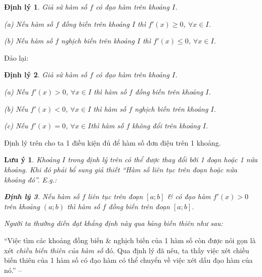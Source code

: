 \documentclass[oneside]{book}
\numberwithin{equation}{section}
\newtheorem{luuy}{Lưu ý}[section]
\newtheorem{dinhly}{Định lý}[section]
\begin{document}
\begin{dinhly}
	Giả sử hàm số $f$ có đạo hàm trên khoảng $I$.
	\begin{enumerate*}
		\item[(a)] Nếu hàm số $f$ đồng biến trên khoảng $I$ thì $f'(x)\ge 0$, $\forall x\in I$.
		\item[(b)] Nếu hàm số $f$ nghịch biến trên khoảng $I$ thì $f'(x)\le 0$, $\forall x\in I$.
	\end{enumerate*}
\end{dinhly}
Đảo lại:

\begin{dinhly}
	\label{thm:dau dao ham & tinh dong bien}
	Giả sử hàm số $f$ có đạo hàm trên khoảng $I$.
	\begin{enumerate*}
		\item[(a)] Nếu $f'(x) > 0$, $\forall x\in I$ thì hàm số $f$ đồng biến trên khoảng $I$.
		\item[(b)] Nếu $f'(x) < 0$, $\forall x\in I$ thì hàm số $f$ nghịch biến trên khoảng $I$.
		\item[(c)] Nếu $f'(x) = 0$, $\forall x\in I$thì hàm số $f$ không đổi trên khoảng $I$.
	\end{enumerate*}
\end{dinhly}
Định lý trên cho ta 1 điều kiện đủ để hàm số đơn điệu trên 1 khoảng.

\begin{luuy}
	Khoảng $I$ trong định lý trên có thể được thay đổi bởi 1 đoạn hoặc 1 nửa khoảng. Khi đó phải bổ sung giả thiết ``Hàm số liên tục trên đoạn hoặc nửa khoảng đó''. E.g.:
	
	\begin{dinhly}
		Nếu hàm số $f$ liên tục trên đoạn $[a;b]$ \& có đạo hàm $f'(x) > 0$ trên khoảng $(a;b)$ thì hàm số $f$ đồng biến trên đoạn $[a;b]$.
	\end{dinhly}
	Người ta thường diễn đạt khẳng định này qua bảng biến thiên như sau:
	
	\begin{center}
	\end{center}
\end{luuy}
``Việc tìm các khoảng đồng biến \& nghịch biến của 1 hàm số còn được nói gọn là xét \textit{chiều biến thiên của hàm số} đó. Qua định lý đã nêu, ta thấy việc xét chiều biến thiên của 1 hàm số có đạo hàm có thể chuyển về việc xét dấu đạo hàm của nó.'' -- \cite[p. 5]{SGK_Toan_12_giai_tich_nang_cao}
\end{document}
